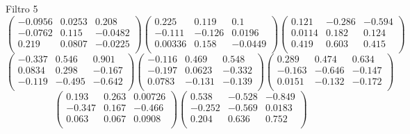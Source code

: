 Filtro 5
{ \small
\[
\begin{pmatrix}
  -0.0956 & 0.0253 & 0.208 \\
  -0.0762 & 0.115 & -0.0482 \\
  0.219 & 0.0807 & -0.0225 \\
\end{pmatrix}
\begin{pmatrix}
  0.225 & 0.119 & 0.1 \\
  -0.111 & -0.126 & 0.0196 \\
  0.00336 & 0.158 & -0.0449 \\
\end{pmatrix}
\begin{pmatrix}
  0.121 & -0.286 & -0.594 \\
  0.0114 & 0.182 & 0.124 \\
  0.419 & 0.603 & 0.415 \\
\end{pmatrix}
\]
\[
\begin{pmatrix}
  -0.337 & 0.546 & 0.901 \\
  0.0834 & 0.298 & -0.167 \\
  -0.119 & -0.495 & -0.642 \\
\end{pmatrix}
\begin{pmatrix}
  -0.116 & 0.469 & 0.548 \\
  -0.197 & 0.0623 & -0.332 \\
  0.0783 & -0.131 & -0.139 \\
\end{pmatrix}
\begin{pmatrix}
  0.289 & 0.474 & 0.634 \\
  -0.163 & -0.646 & -0.147 \\
  0.0151 & -0.132 & -0.172 \\
\end{pmatrix}
\]
\[
\begin{pmatrix}
  0.193 & 0.263 & 0.00726 \\
  -0.347 & 0.167 & -0.466 \\
  0.063 & 0.067 & 0.0908 \\
\end{pmatrix}
\begin{pmatrix}
  0.538 & -0.528 & -0.849 \\
  -0.252 & -0.569 & 0.0183 \\
  0.204 & 0.636 & 0.752 \\
\end{pmatrix}
\]
}

